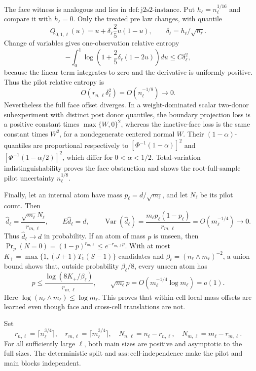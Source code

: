 The face witness is analogous and lies in \(\mathrm{def:j2s2\mbox{-}instance}\).  Put \(h_\ell=n_\ell^{1/16}\) and compare it with \(h_\ell=0\).  Only the treated pre law changes, with quantile
\[
 Q_{0,1,\ell}(u)=u+\delta_\ell\frac25u(1-u),
 \qquad \delta_\ell=h_\ell/\sqrt{n_\ell}.
\]
Change of variables gives one-observation relative entropy
\[
 -\int_0^1\log\left(1+\frac25\delta_\ell(1-2u)\right)du
 \leq C\delta_\ell^2,
\]
because the linear term integrates to zero and the derivative is uniformly positive.  Thus the pilot relative entropy is
\[
 O(r_{n,\ell}\delta_\ell^2)=O(n_\ell^{-1/8})\longrightarrow0.
\]
Nevertheless the full face offset diverges.  In a weight-dominated scalar two-donor subexperiment with distinct post donor quantiles, the boundary projection loss is a positive constant times \(\max\{W,0\}^2\), whereas the inactive-face loss is the same constant times \(W^2\), for a nondegenerate centered normal \(W\).  Their \((1-\alpha)\)-quantiles are proportional respectively to
\([\Phi^{-1}(1-\alpha)]^2\) and
\([\Phi^{-1}(1-\alpha/2)]^2\), which differ for \(0<\alpha<1/2\).  Total-variation indistinguishability proves the face obstruction and shows the root-full-sample pilot uncertainty \(n_\ell^{1/8}\).

Finally, let an internal atom have mass \(p_\ell=d/\sqrt{m_\ell}\), and let \(N_\ell\) be its pilot count.  Then
\[
 \widehat d_\ell=\frac{\sqrt{m_\ell}N_\ell}{r_{m,\ell}},
 \qquad
 E\widehat d_\ell=d,
 \qquad
 \operatorname{Var}(\widehat d_\ell)
 =\frac{m_\ell p_\ell(1-p_\ell)}{r_{m,\ell}}
 =O(m_\ell^{-1/4})\to0.
\]
Thus \(\widehat d_\ell\to d\) in probability.  If an atom of mass \(p\) is unseen, then
\(\Pr_p(N=0)=(1-p)^{r_{m,\ell}}\leq e^{-r_{m,\ell}p}\).  With at most
\(K_+=\max\{1,(J+1)T_1(S-1)\}\) candidates and
\(\beta_\ell=(n_\ell\wedge m_\ell)^{-2}\), a union bound shows that, outside probability \(\beta_\ell/8\), every unseen atom has
\[
 p\leq\frac{\log(8K_+/\beta_\ell)}{r_{m,\ell}},
 \qquad
 \sqrt{m_\ell}p=O(m_\ell^{-1/4}\log m_\ell)=o(1).
\]
Here \(\log(n_\ell\wedge m_\ell)\leq\log m_\ell\).  This proves that within-cell local mass offsets are learned even though face and cross-cell translations are not.

Set
\[
 r_{n,\ell}=\lceil n_\ell^{3/4}\rceil,
 \quad r_{m,\ell}=\lceil m_\ell^{3/4}\rceil,
 \quad N_{n,\ell}=n_\ell-r_{n,\ell},
 \quad N_{m,\ell}=m_\ell-r_{m,\ell}.
\]
For all sufficiently large \(\ell\), both main sizes are positive and asymptotic to the full sizes.  The deterministic split and
\(\mathrm{ass:cell\mbox{-}independence}\) make the pilot and main blocks independent.

